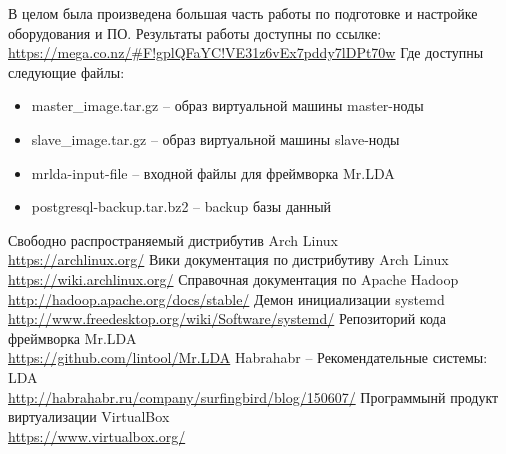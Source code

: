 В целом была произведена большая часть работы по подготовке и настройке оборудования и ПО. Результаты 
работы доступны по ссылке:\\
\url{https://mega.co.nz/#F!gplQFaYC!VE31z6vEx7pddy7lDPt70w}
Где доступны следующие файлы:
\begin{itemize}
    \item master\_image.tar.gz -- образ виртуальной машины master-ноды
    \item slave\_image.tar.gz -- образ виртуальной машины slave-ноды
    \item mrlda-input-file -- входной файлы для фреймворка Mr.LDA
    \item postgresql-backup.tar.bz2 -- backup базы данный
\end{itemize}

\newpage

\renewcommand{\bibname}{Информационные источники}
\begin{thebibliography}{10}
     Свободно распространяемый дистрибутив Arch Linux\\
        \url{https://archlinux.org/}
     Вики документация по дистрибутиву Arch Linux\\
        \url{https://wiki.archlinux.org/}
     Справочная документация по Apache Hadoop\\
        \url{http://hadoop.apache.org/docs/stable/}
     Демон инициализации systemd\\
        \url{http://www.freedesktop.org/wiki/Software/systemd/}
     Репозиторий кода фреймворка Mr.LDA\\
        \url{https://github.com/lintool/Mr.LDA}
     Habrahabr -- Рекомендательные системы: LDA\\
        \url{http://habrahabr.ru/company/surfingbird/blog/150607/}
     Программынй продукт виртуализации VirtualBox\\
        \url{https://www.virtualbox.org/}
\end{thebibliography}

